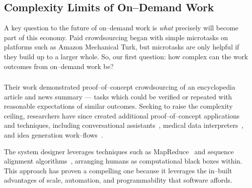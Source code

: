 \documentclass[trackingWork]{subfiles}
\begin{document}
\begin{comment}
Crowdwork
  - Kittur said let's do complex stuff
  - This works by using CS techniques
  - Clear that this works in focused cases
  - More recent shift toward using experts
\end{comment}

\subsection[What are the complexity limits of on--demand work]
{Complexity Limits of On--Demand Work}\label{sec:complexity}
A key question to the future of on--demand work is
\textit{what} precisely will become part of this economy.
Paid crowdsourcing began with simple microtasks on platforms such as
Amazon Mechanical Turk, but
microtasks are only helpful if they build up to a larger whole.
So, our first question:
how complex can the work outcomes from on--demand work be?

\subsubsection{\crowdworkpers}
Their work demonstrated proof--of--concept crowdsourcing of
an encyclopedia article and news summary
--- tasks which could be verified or repeated
with reasonable expectations of similar outcomes.
Seeking to raise the complexity ceiling,
researchers have since created
additional proof--of--concept applications and techniques,
including conversational assistants~\cite{lasecki2013chorus},
medical data interpreters~\cite{lasecki2013chorus}, and
idea generation work--flows~\cite{YuEncouragingOutside,yu2014distributed,Yu2016a}.

The system designer leverages techniques such as MapReduce~\cite{crowdForgeKittur} and
sequence alignment algorithms~\cite{lasecki2012real}, arranging humans as computational black boxes within.
This approach has proven a compelling one because
it leverages the in--built advantages of
scale,
automation, and
programmability that software affords.
\end{document}
